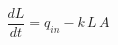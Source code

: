 \documentclass[preview]{standalone}
\begin{document}
\begin{align*}
\dfrac{dL}{dt} = q_{in} - k\,L\,A
\end{align*}
\end{document}

